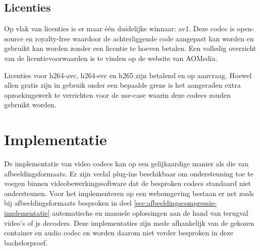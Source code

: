 \subsection{Licenties}
\label{sec:videocompressie-licentie}

Op vlak van licenties is er maar één duidelijke winnaar: \gls{av1}. Deze \gls{codec} is \gls{open-source} en royalty-free waardoor de achterliggende code aangepast kan worden en gebruikt kan worden zonder een licentie te hoeven betalen. Een volledig overzicht van de licentievoorwaarden is te vinden op de website van AOMedia.

Licenties voor \gls{h264-avc}, \gls{h264-svc} en \gls{h265} zijn betalend en op aanvraag. Hoewel allen gratis zijn in gebruik onder een bepaalde grens is het aangeraden extra opzoekingswerk te verrichten voor de \gls{use-case} waarin deze \glspl{codec} zouden gebruikt worden.

\section{Implementatie}
\label{sec:videocompressie-implementatie}

De implementatie van video \glspl{codec} kan op een gelijkaardige manier als die van \glspl{afbeeldingsformaat}. Er zijn veelal \glspl{plug-in} beschikbaar om ondersteuning toe te voegen binnen videobewerkingssoftware dat de besproken \glspl{codec} standaard niet ondersteunen. Voor het implementeren op een webomgeving bestaan er net zoals bij \glspl{afbeeldingsformaat} besproken in deel \ref{sec:afbeeldingscompressie-implementatie} automatische en manuele oplossingen aan de hand van terugval video's of \gls{js} \glspl{decoder}. Deze implementaties zijn mede afhankelijk van de gekozen \gls{container} en audio \gls{codec} en worden daarom niet verder besproken in deze bachelorproef.
